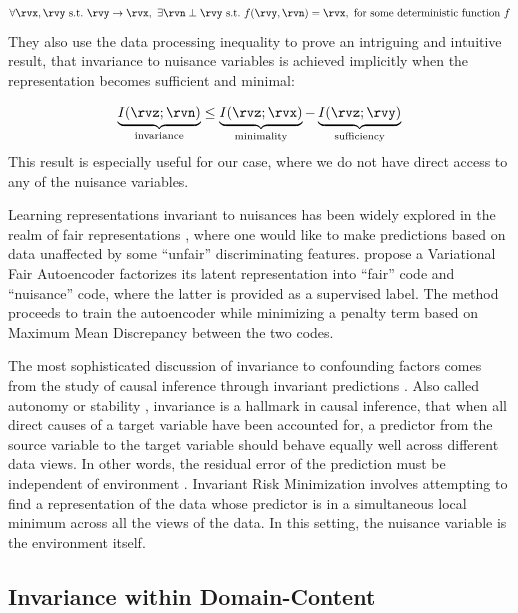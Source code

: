 \documentclass[withindex,glossary,firstyr,times]{cam-thesis}
\begin{document}
\begin{equation}
    \forall \rvx, \rvy ~ \text{s.t.} ~ \rvy \to \rvx, ~ \exists \rvn \perp \rvy ~ \text{s.t.} ~ f(\rvy, \rvn) = \rvx, ~ \text{for some deterministic function} ~ f
\end{equation}
They also use the data processing inequality \cite{cover1999elements} to prove an intriguing and intuitive result, that invariance to nuisance variables is achieved implicitly when the representation becomes sufficient and minimal:

\begin{equation}
    \underbrace{I(\rvz; \rvn)}_{\text{invariance}} \leq \underbrace{I(\rvz; \rvx)}_{\text{minimality}} - \underbrace{I(\rvz; \rvy)}_{\text{sufficiency}}
\end{equation}
This result is especially useful for our case, where we do not have direct access to any of the nuisance variables.

Learning representations invariant to nuisances has been widely explored in the realm of fair representations \cite{zemel2013learning, hardt2016equality, louizos2016variational}, where one would like to make predictions based on data unaffected by some ``unfair'' discriminating features. \citet{louizos2016variational} propose a Variational Fair Autoencoder factorizes its latent representation into ``fair'' code and ``nuisance'' code, where the latter is provided as a supervised label. The method proceeds to train the autoencoder while minimizing a penalty term based on Maximum Mean Discrepancy \cite{gretton2007kernel} between the two codes.

The most sophisticated discussion of invariance to confounding factors comes from the study of causal inference through invariant predictions \cite{peters2016causal, arjovsky2019invariant}. Also called autonomy or stability \cite{pearl2009causality}, invariance is a hallmark in causal inference, that when all direct causes of a target variable have been accounted for, a predictor from the source variable to the target variable should behave equally well across different data views. In other words, the residual error of the prediction must be independent of environment \cite{magliacane2018domain}. Invariant Risk Minimization \cite{arjovsky2019invariant} involves attempting to find a representation of the data whose predictor is in a simultaneous local minimum across all the views of the data. In this setting, the nuisance variable is the environment itself.

\subsection{Invariance within Domain-Content}
\end{document}
